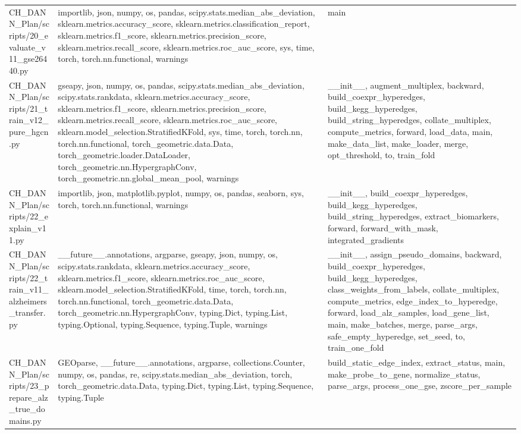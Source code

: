 \documentclass[11pt]{article}
\begin{document}
\begin{longtable}{p{}p{}p{}}
CH\_DANN\_Plan/scripts/20\_evaluate\_v11\_gse26440.py & importlib, json, numpy, os, pandas, scipy.stats.median\_abs\_deviation, sklearn.metrics.accuracy\_score, sklearn.metrics.classification\_report, sklearn.metrics.f1\_score, sklearn.metrics.precision\_score, sklearn.metrics.recall\_score, sklearn.metrics.roc\_auc\_score, sys, time, torch, torch.nn.functional, warnings & main \\
CH\_DANN\_Plan/scripts/21\_train\_v12\_pure\_hgcn.py & gseapy, json, numpy, os, pandas, scipy.stats.median\_abs\_deviation, scipy.stats.rankdata, sklearn.metrics.accuracy\_score, sklearn.metrics.f1\_score, sklearn.metrics.precision\_score, sklearn.metrics.recall\_score, sklearn.metrics.roc\_auc\_score, sklearn.model\_selection.StratifiedKFold, sys, time, torch, torch.nn, torch.nn.functional, torch\_geometric.data.Data, torch\_geometric.loader.DataLoader, torch\_geometric.nn.HypergraphConv, torch\_geometric.nn.global\_mean\_pool, warnings & \_\_init\_\_, augment\_multiplex, backward, build\_coexpr\_hyperedges, build\_kegg\_hyperedges, build\_string\_hyperedges, collate\_multiplex, compute\_metrics, forward, load\_data, main, make\_data\_list, make\_loader, merge, opt\_threshold, to, train\_fold \\
CH\_DANN\_Plan/scripts/22\_explain\_v11.py & importlib, json, matplotlib.pyplot, numpy, os, pandas, seaborn, sys, torch, torch.nn.functional, warnings & \_\_init\_\_, build\_coexpr\_hyperedges, build\_kegg\_hyperedges, build\_string\_hyperedges, extract\_biomarkers, forward, forward\_with\_mask, integrated\_gradients \\
CH\_DANN\_Plan/scripts/22\_train\_v11\_alzheimers\_transfer.py & \_\_future\_\_.annotations, argparse, gseapy, json, numpy, os, scipy.stats.rankdata, sklearn.metrics.accuracy\_score, sklearn.metrics.f1\_score, sklearn.metrics.roc\_auc\_score, sklearn.model\_selection.StratifiedKFold, time, torch, torch.nn, torch.nn.functional, torch\_geometric.data.Data, torch\_geometric.nn.HypergraphConv, typing.Dict, typing.List, typing.Optional, typing.Sequence, typing.Tuple, warnings & \_\_init\_\_, assign\_pseudo\_domains, backward, build\_coexpr\_hyperedges, build\_kegg\_hyperedges, class\_weights\_from\_labels, collate\_multiplex, compute\_metrics, edge\_index\_to\_hyperedge, forward, load\_alz\_samples, load\_gene\_list, main, make\_batches, merge, parse\_args, safe\_empty\_hyperedge, set\_seed, to, train\_one\_fold \\
CH\_DANN\_Plan/scripts/23\_prepare\_alz\_true\_domains.py & GEOparse, \_\_future\_\_.annotations, argparse, collections.Counter, numpy, os, pandas, re, scipy.stats.median\_abs\_deviation, torch, torch\_geometric.data.Data, typing.Dict, typing.List, typing.Sequence, typing.Tuple & build\_static\_edge\_index, extract\_status, main, make\_probe\_to\_gene, normalize\_status, parse\_args, process\_one\_gse, zscore\_per\_sample \\

\end{longtable}
\end{document}
